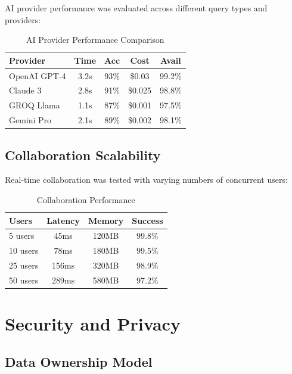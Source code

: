 \documentclass[conference]{IEEEtran}
\begin{document}
AI provider performance was evaluated across different query types and providers:

\begin{table}[htbp]
\caption{AI Provider Performance Comparison}
\begin{center}
\begin{tabular}{|l|c|c|c|c|}
\hline
\textbf{Provider} & \textbf{Time} & \textbf{Acc} & \textbf{Cost} & \textbf{Avail} \\
\hline
OpenAI GPT-4 & 3.2s & 93\% & \$0.03 & 99.2\% \\
Claude 3 & 2.8s & 91\% & \$0.025 & 98.8\% \\
GROQ Llama & 1.1s & 87\% & \$0.001 & 97.5\% \\
Gemini Pro & 2.1s & 89\% & \$0.002 & 98.1\% \\
\hline
\end{tabular}
\end{center}
\label{tab:ai_performance}
\end{table}

\subsection{Collaboration Scalability}

Real-time collaboration was tested with varying numbers of concurrent users:

\begin{table}[htbp]
\caption{Collaboration Performance}
\begin{center}
\begin{tabular}{|l|c|c|c|}
\hline
\textbf{Users} & \textbf{Latency} & \textbf{Memory} & \textbf{Success} \\
\hline
5 users & 45ms & 120MB & 99.8\% \\
10 users & 78ms & 180MB & 99.5\% \\
25 users & 156ms & 320MB & 98.9\% \\
50 users & 289ms & 580MB & 97.2\% \\
\hline
\end{tabular}
\end{center}
\label{tab:collaboration}
\end{table}

\section{Security and Privacy}

\subsection{Data Ownership Model}
\end{document}
